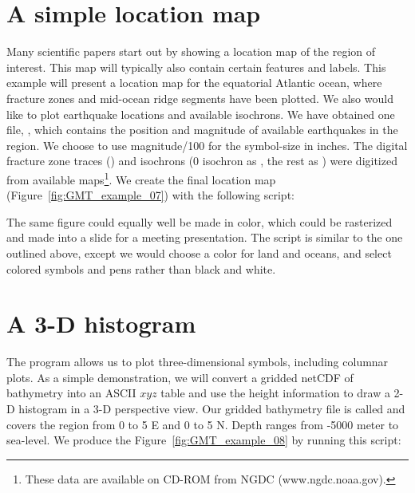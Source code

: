 \section{A simple location map}

Many scientific papers start out by showing a location map
of the region of interest. This map will typically also
contain certain features and labels.  This example will
present a location map for the equatorial Atlantic ocean,
where fracture zones and mid-ocean ridge segments have been
plotted.  We also would like to plot earthquake locations
and available isochrons.  We have obtained one file,
, which contains the position and magnitude of
available earthquakes in the region.  We choose to use
magnitude/100 for the symbol-size in inches.  The digital
fracture zone traces () and isochrons (0 isochron as
, the rest as ) were digitized from
available maps\footnote{These data are available on CD-ROM from NGDC (www.ngdc.noaa.gov).}.
We create the final location map
(Figure~\ref{fig:GMT_example_07}) with the following script:


The same figure could equally well be made in color, which
could be rasterized and made into a slide for a meeting
presentation.  The script is similar to the one outlined
above, except we would choose a color for land and oceans,
and select colored symbols and pens rather than black and white.


\section{A 3-D histogram}

The program  allows us to plot three-dimensional
symbols, including columnar plots.  As a simple demonstration,
we will convert a gridded netCDF of bathymetry into an
ASCII $xyz$ table and use the height information to draw a
2-D histogram in a 3-D perspective view.  Our gridded
bathymetry file is called  and covers the region
from 0 to 5 \DS E and 0 to 5 \DS N.  Depth ranges from
-5000 meter to sea-level.  We produce the Figure~\ref{fig:GMT_example_08} by
running this script:


